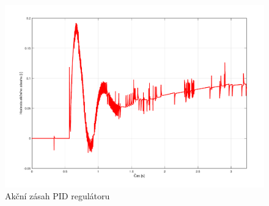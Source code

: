 \documentclass[a4paper,12pt]{article}
\begin{document}
\begin{figure}[H]
	\centering
    \includegraphics[scale=0.55]{odezva_kyvadlo_PID_akcnizasah}
    \caption{Akční zásah PID regulátoru}
\end{figure}
\end{document}

